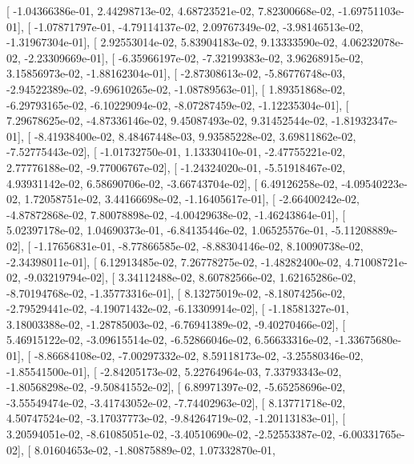 \documentclass{article}
\begin{document}
       [ -1.04366386e-01,   2.44298713e-02,   4.68723521e-02,
          7.82300668e-02,  -1.69751103e-01],
       [ -1.07871797e-01,  -4.79114137e-02,   2.09767349e-02,
         -3.98146513e-02,  -1.31967304e-01],
       [  2.92553014e-02,   5.83904183e-02,   9.13333590e-02,
          4.06232078e-02,  -2.23309669e-01],
       [ -6.35966197e-02,  -7.32199383e-02,   3.96268915e-02,
          3.15856973e-02,  -1.88162304e-01],
       [ -2.87308613e-02,  -5.86776748e-03,  -2.94522389e-02,
         -9.69610265e-02,  -1.08789563e-01],
       [  1.89351868e-02,  -6.29793165e-02,  -6.10229094e-02,
         -8.07287459e-02,  -1.12235304e-01],
       [  7.29678625e-02,  -4.87336146e-02,   9.45087493e-02,
          9.31452544e-02,  -1.81932347e-01],
       [ -8.41938400e-02,   8.48467448e-03,   9.93585228e-02,
          3.69811862e-02,  -7.52775443e-02],
       [ -1.01732750e-01,   1.13330410e-01,  -2.47755221e-02,
          2.77776188e-02,  -9.77006767e-02],
       [ -1.24324020e-01,  -5.51918467e-02,   4.93931142e-02,
          6.58690706e-02,  -3.66743704e-02],
       [  6.49126258e-02,  -4.09540223e-02,   1.72058751e-02,
          3.44166698e-02,  -1.16405617e-01],
       [ -2.66400242e-02,  -4.87872868e-02,   7.80078898e-02,
         -4.00429638e-02,  -1.46243864e-01],
       [  5.02397178e-02,   1.04690373e-01,  -6.84135446e-02,
          1.06525576e-01,  -5.11208889e-02],
       [ -1.17656831e-01,  -8.77866585e-02,  -8.88304146e-02,
          8.10090738e-02,  -2.34398011e-01],
       [  6.12913485e-02,   7.26778275e-02,  -1.48282400e-02,
          4.71008721e-02,  -9.03219794e-02],
       [  3.34112488e-02,   8.60782566e-02,   1.62165286e-02,
         -8.70194768e-02,  -1.35773316e-01],
       [  8.13275019e-02,  -8.18074256e-02,  -2.79529441e-02,
         -4.19071432e-02,  -6.13309914e-02],
       [ -1.18581327e-01,   3.18003388e-02,  -1.28785003e-02,
         -6.76941389e-02,  -9.40270466e-02],
       [  5.46915122e-02,  -3.09615514e-02,  -6.52866046e-02,
          6.56633316e-02,  -1.33675680e-01],
       [ -8.86684108e-02,  -7.00297332e-02,   8.59118173e-02,
         -3.25580346e-02,  -1.85541500e-01],
       [ -2.84205173e-02,   5.22764964e-03,   7.33793343e-02,
         -1.80568298e-02,  -9.50841552e-02],
       [  6.89971397e-02,  -5.65258696e-02,  -3.55549474e-02,
         -3.41743052e-02,  -7.74402963e-02],
       [  8.13771718e-02,   4.50747524e-02,  -3.17037773e-02,
         -9.84264719e-02,  -1.20113183e-01],
       [  3.20594051e-02,  -8.61085051e-02,  -3.40510690e-02,
         -2.52553387e-02,  -6.00331765e-02],
       [  8.01604653e-02,  -1.80875889e-02,   1.07332870e-01,
\end{document}
